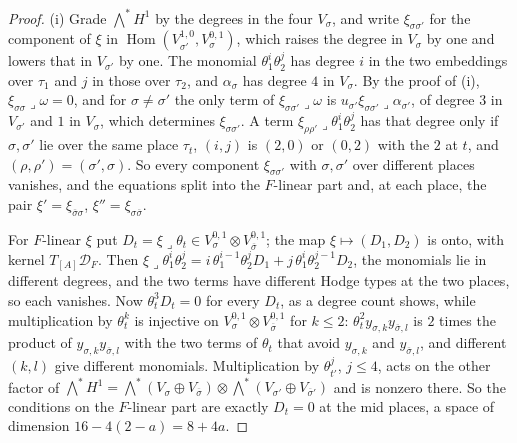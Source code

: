 \documentclass[11pt,reqno]{amsart}
\theoremstyle{plain}
\theoremstyle{definition}
\theoremstyle{remark}
\newcommand{\cD}{\mathcal{D}}
\DeclareMathOperator{\Hom}{Hom}
\newcommand{\bbar}[1]{\overline{#1}}
\begin{document}
\begin{proof}
(i) Grade $\bigwedge^{*}H^{1}$ by the degrees in the four $V_{\sigma}$, and
write $\xi_{\sigma\sigma'}$ for the component of $\xi$ in
$\Hom(V_{\sigma'}^{1,0},V_{\sigma}^{0,1})$, which raises the degree in
$V_{\sigma}$ by one and lowers that in $V_{\sigma'}$ by one. The monomial
$\theta_{1}^{i}\theta_{2}^{j}$ has degree $i$ in the two embeddings over
$\tau_{1}$ and $j$ in those over $\tau_{2}$, and $\alpha_{\sigma}$ has degree
$4$ in $V_{\sigma}$. By the proof of (i),
$\xi_{\sigma\sigma}\lrcorner\omega=0$, and for $\sigma\ne\sigma'$ the only
term of $\xi_{\sigma\sigma'}\lrcorner\omega$ is
$u_{\sigma'}\xi_{\sigma\sigma'}\lrcorner\alpha_{\sigma'}$, of degree $3$ in
$V_{\sigma'}$ and $1$ in $V_{\sigma}$, which determines $\xi_{\sigma\sigma'}$.
A term $\xi_{\rho\rho'}\lrcorner\theta_{1}^{i}\theta_{2}^{j}$ has that degree
only if $\sigma,\sigma'$ lie over the same place $\tau_{t}$, $(i,j)$ is
$(2,0)$ or $(0,2)$ with the $2$ at $t$, and $(\rho,\rho')=(\sigma',\sigma)$.
So every component $\xi_{\sigma\sigma'}$ with $\sigma,\sigma'$ over different
places vanishes, and the equations split into the $F$-linear part and, at
each place, the pair $\xi'=\xi_{\bbar\sigma\sigma}$, $\xi''=\xi_{\sigma\bbar\sigma}$.

For $F$-linear $\xi$ put $D_{t}=\xi\lrcorner\theta_{t}\in V_{\sigma}^{0,1}
\otimes V_{\bbar\sigma}^{0,1}$; the map $\xi\mapsto(D_{1},D_{2})$ is onto, with
kernel $T_{[A]}\cD_{F}$. Then $\xi\lrcorner\theta_{1}^{i}\theta_{2}^{j}
=i\,\theta_{1}^{i-1}\theta_{2}^{j}D_{1}+j\,\theta_{1}^{i}\theta_{2}^{j-1}D_{2}$,
the monomials lie in different degrees, and the two terms have different
Hodge types at the two places, so each vanishes. Now $\theta_{t}^{3}D_{t}=0$
for every $D_{t}$, as a degree count shows, while multiplication by
$\theta_{t}^{k}$ is injective on $V_{\sigma}^{0,1}\otimes V_{\bbar\sigma}^{0,1}$
for $k\le2$: $\theta_{t}^{2}y_{\sigma,k}y_{\bbar\sigma,l}$ is $2$ times the
product of $y_{\sigma,k}y_{\bbar\sigma,l}$ with the two terms of $\theta_{t}$
that avoid $y_{\sigma,k}$ and $y_{\bbar\sigma,l}$, and different $(k,l)$ give
different monomials. Multiplication by $\theta_{t'}^{j}$, $j\le4$, acts on the
other factor of $\bigwedge^{*}H^{1}=\bigwedge^{*}(V_{\sigma}\oplus
V_{\bbar\sigma})\otimes\bigwedge^{*}(V_{\sigma'}\oplus V_{\bbar\sigma'})$ and is
nonzero there. So the conditions on the $F$-linear part are exactly $D_{t}=0$
at the mid places, a space of dimension $16-4(2-a)=8+4a$.


\end{proof}
\end{document}
